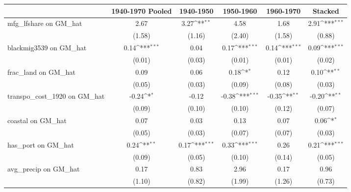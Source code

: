 {
\def\sym#1{\ifmmode^{#1}\else\(^{#1}\)\fi}
\begin{tabular}{l*{5}{c}}
\toprule
                &\multicolumn{1}{c}{1940-1970 Pooled}&\multicolumn{1}{c}{1940-1950}&\multicolumn{1}{c}{1950-1960}&\multicolumn{1}{c}{1960-1970}&\multicolumn{1}{c}{Stacked}\\
\midrule
mfg\_lfshare on GM\_hat&     2.67         &     3.27\sym{**} &     4.58         &     1.68         &     2.91\sym{***}\\
                &   (1.58)         &   (1.16)         &   (2.40)         &   (1.58)         &   (0.88)         \\
\addlinespace
blackmig3539 on GM\_hat&     0.14\sym{***}&     0.04         &     0.17\sym{***}&     0.14\sym{***}&     0.09\sym{***}\\
                &   (0.01)         &   (0.03)         &   (0.01)         &   (0.01)         &   (0.02)         \\
\addlinespace
frac\_land on GM\_hat&     0.09         &     0.06         &     0.18\sym{*}  &     0.12         &     0.10\sym{**} \\
                &   (0.05)         &   (0.03)         &   (0.09)         &   (0.08)         &   (0.03)         \\
\addlinespace
transpo\_cost\_1920 on GM\_hat&    -0.24\sym{*}  &    -0.12         &    -0.38\sym{***}&    -0.35\sym{**} &    -0.20\sym{**} \\
                &   (0.09)         &   (0.10)         &   (0.10)         &   (0.12)         &   (0.07)         \\
\addlinespace
coastal on GM\_hat&     0.07         &     0.03         &     0.13         &     0.07         &     0.06\sym{*}  \\
                &   (0.05)         &   (0.03)         &   (0.07)         &   (0.07)         &   (0.03)         \\
\addlinespace
has\_port on GM\_hat&     0.24\sym{**} &     0.17\sym{***}&     0.33\sym{***}&     0.26         &     0.21\sym{***}\\
                &   (0.09)         &   (0.05)         &   (0.10)         &   (0.14)         &   (0.05)         \\
\addlinespace
avg\_precip on GM\_hat&     0.17         &     0.83         &     2.96         &     0.17         &     0.96         \\
                &   (1.10)         &   (0.82)         &   (1.99)         &   (1.26)         &   (0.73)         \\

\end{tabular}}
